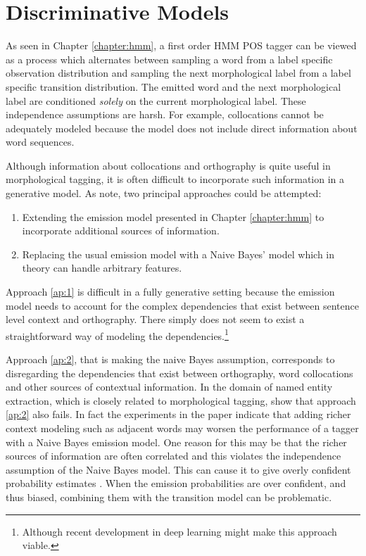 \chapter{Discriminative Models}
\label{chapter:crf}

As seen in Chapter \ref{chapter:hmm}, a first order HMM POS tagger can
be viewed as a process which alternates between sampling a word from a
label specific observation distribution and sampling the next
morphological label from a label specific transition distribution. The
emitted word and the next morphological label are conditioned {\it
  solely} on the current morphological label. These independence
assumptions are harsh. For example, collocations cannot be adequately
modeled because the model does not include direct information about
word sequences.

Although information about collocations and orthography is quite
useful in morphological tagging, it is often difficult to incorporate
such information in a generative model. As \cite{Sutton2012} note, two
principal approaches could be attempted:
\begin{enumerate}
\item Extending the emission model presented in Chapter
  \ref{chapter:hmm} to incorporate additional sources of
  information.\label{ap:1}
\item Replacing the usual emission model with a Naive
  Bayes' model which in theory can handle arbitrary
  features.\label{ap:2}
\end{enumerate}

Approach \ref{ap:1} is difficult in a fully generative setting because the
emission model needs to account for the complex dependencies that
exist between sentence level context and orthography. There simply does not
seem to exist a straightforward way of modeling the dependencies.\footnote{Although recent development in deep learning might make this approach viable.}

Approach \ref{ap:2}, that is making the naive Bayes assumption,
corresponds to disregarding the dependencies that exist between
orthography, word collocations and other sources of contextual
information. In the domain of named entity extraction, which is
closely related to morphological tagging, \cite{Ruokolainen2013} show
that approach \ref{ap:2} also fails. In fact the experiments in the
paper indicate that adding richer context modeling such as adjacent
words may worsen the performance of a tagger with a Naive Bayes
emission model. One reason for this may be that the richer sources of
information are often correlated and this violates the independence
assumption of the Naive Bayes model. This can cause it to give overly
confident probability estimates \citep{Sutton2012}. When the emission
probabilities are over confident, and thus biased, combining them with
the transition model can be problematic.

